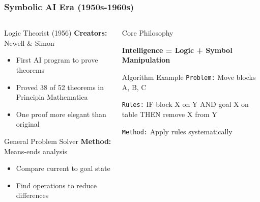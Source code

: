 \documentclass{beamer}
\begin{document}
\begin{frame}
    \frametitle{Symbolic AI Era (1950s-1960s)}
    \begin{columns}
        \begin{column}{0.48\textwidth}
            \begin{block}{Logic Theorist (1956)}
                \textbf{Creators:} Newell \& Simon
                \begin{itemize}
                    \item First AI program to prove theorems
                    \item Proved 38 of 52 theorems in Principia Mathematica
                    \item One proof more elegant than original
                \end{itemize}
            \end{block}
            
            \begin{block}{General Problem Solver}
                \textbf{Method:} Means-ends analysis
                \begin{itemize}
                    \item Compare current to goal state
                    \item Find operations to reduce differences
                \end{itemize}
            \end{block}
        \end{column}
        \begin{column}{0.48\textwidth}
            \begin{alertblock}{Core Philosophy}
                
                \textbf{Intelligence = Logic + Symbol Manipulation}
                
            \end{alertblock}
            
            \begin{exampleblock}{Algorithm Example}
                \texttt{Problem:} Move blocks A, B, C
                
                \texttt{Rules:} IF block X on Y AND goal X on table THEN remove X from Y
                
                \texttt{Method:} Apply rules systematically
            \end{exampleblock}
        \end{column}
    \end{columns}
\end{frame}
\end{document}
